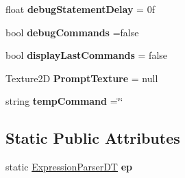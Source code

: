 \begin{DoxyCompactItemize}
\item 
float {\bfseries debug\+Statement\+Delay} = 0f\hypertarget{class_my_game_manager_a5b033fc99a9377e35459bb87deb602cc}{}\label{class_my_game_manager_a5b033fc99a9377e35459bb87deb602cc}

\item 
bool {\bfseries debug\+Commands} =false\hypertarget{class_my_game_manager_a5cc61dd446b1927099a38995a8011f8f}{}\label{class_my_game_manager_a5cc61dd446b1927099a38995a8011f8f}

\item 
bool {\bfseries display\+Last\+Commands} = false\hypertarget{class_my_game_manager_a0f74d79ea9bcfe5ea80f509e59ec427c}{}\label{class_my_game_manager_a0f74d79ea9bcfe5ea80f509e59ec427c}

\item 
Texture2D {\bfseries Prompt\+Texture} = null\hypertarget{class_my_game_manager_a2e34283a9b6ef5341f7fe2dfc6b21ca4}{}\label{class_my_game_manager_a2e34283a9b6ef5341f7fe2dfc6b21ca4}

\item 
string {\bfseries temp\+Command} =\char`\"{}\char`\"{}\hypertarget{class_my_game_manager_a0f8b18c003f6164edf330e6867950e68}{}\label{class_my_game_manager_a0f8b18c003f6164edf330e6867950e68}

\end{DoxyCompactItemize}
\subsection*{Static Public Attributes}
\begin{DoxyCompactItemize}
\item 
static \hyperlink{class_expression_parser_d_t}{Expression\+Parser\+DT} {\bfseries ep}\hypertarget{class_my_game_manager_a835c97990a1b88d3e05db78c302eec97}{}\label{class_my_game_manager_a835c97990a1b88d3e05db78c302eec97}

\end{DoxyCompactItemize}
